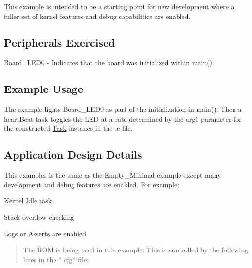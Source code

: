 This example is intended to be a starting point for new development where a fuller set of kernel features and debug capabilities are enabled.

\subsection*{Peripherals Exercised}


\begin{DoxyItemize}
\item {\ttfamily Board\+\_\+\+L\+E\+D0} -\/ Indicates that the board was initialized within {\ttfamily main()}
\end{DoxyItemize}

\subsection*{Example Usage}


\begin{DoxyItemize}
\item The example lights {\ttfamily Board\+\_\+\+L\+E\+D0} as part of the initialization in {\ttfamily main()}. Then a heart\+Beat task toggles the L\+ED at a rate determined by the {\ttfamily arg0} parameter for the constructed \mbox{\hyperlink{struct_task}{Task}} instance in the .c file.
\end{DoxyItemize}

\subsection*{Application Design Details}

This examples is the same as the Empty\+\_\+\+Minimal example except many development and debug features are enabled. For example\+:


\begin{DoxyItemize}
\item Kernel Idle task
\item Stack overflow checking
\item Logs or Asserts are enabled
\end{DoxyItemize}

\begin{quote}
The R\+OM is being used in this example. This is controlled by the following lines in the $\ast$.cfg$\ast$ file\+: \end{quote}


